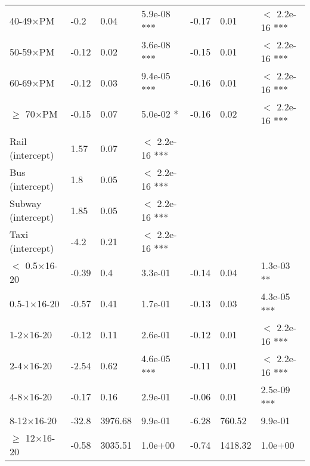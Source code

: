 \documentclass{article}\usepackage[utf8]{inputenc}
\begin{document}
\begin{longtable}[t]{lllllll}
\hspace{1em}40-49$\times$PM & -0.2 & 0.04 & 5.9e-08 *** & -0.17 & 0.01 & $<$ 2.2e-16 ***\\
\hspace{1em}50-59$\times$PM & -0.12 & 0.02 & 3.6e-08 *** & -0.15 & 0.01 & $<$ 2.2e-16 ***\\
\hspace{1em}60-69$\times$PM & -0.12 & 0.03 & 9.4e-05 *** & -0.16 & 0.01 & $<$ 2.2e-16 ***\\
\hspace{1em}$\geq$ 70$\times$PM & -0.15 & 0.07 & 5.0e-02 * & -0.16 & 0.02 & $<$ 2.2e-16 ***\\
\addlinespace[0.3em]
\multicolumn{7}{l}{\textbf{Distance$\times$Age, McFadden $R^2 = 0.57$}}\\
\hline
\hspace{1em}Rail (intercept) & 1.57 & 0.07 & $<$ 2.2e-16 *** &  &  & \\
\hspace{1em}Bus (intercept) & 1.8 & 0.05 & $<$ 2.2e-16 *** &  &  & \\
\hspace{1em}Subway (intercept) & 1.85 & 0.05 & $<$ 2.2e-16 *** &  &  & \\
\hspace{1em}Taxi (intercept) & -4.2 & 0.21 & $<$ 2.2e-16 *** &  &  & \\
\hspace{1em}$<$ 0.5$\times$16-20 & -0.39 & 0.4 & 3.3e-01 & -0.14 & 0.04 & 1.3e-03 **\\
\hspace{1em}0.5-1$\times$16-20 & -0.57 & 0.41 & 1.7e-01 & -0.13 & 0.03 & 4.3e-05 ***\\
\hspace{1em}1-2$\times$16-20 & -0.12 & 0.11 & 2.6e-01 & -0.12 & 0.01 & $<$ 2.2e-16 ***\\
\hspace{1em}2-4$\times$16-20 & -2.54 & 0.62 & 4.6e-05 *** & -0.11 & 0.01 & $<$ 2.2e-16 ***\\
\hspace{1em}4-8$\times$16-20 & -0.17 & 0.16 & 2.9e-01 & -0.06 & 0.01 & 2.5e-09 ***\\
\hspace{1em}8-12$\times$16-20 & -32.8 & 3976.68 & 9.9e-01 & -6.28 & 760.52 & 9.9e-01\\
\hspace{1em}$\geq$ 12$\times$16-20 & -0.58 & 3035.51 & 1.0e+00 & -0.74 & 1418.32 & 1.0e+00\\

\end{longtable}
\end{document}
